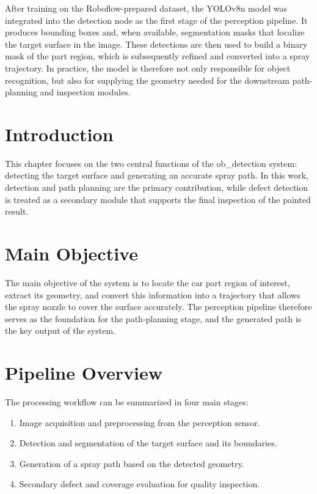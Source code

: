 After training on the Roboflow-prepared dataset, the YOLOv8n model was integrated into the detection node as the first stage of the perception pipeline. It produces bounding boxes and, when available, segmentation masks that localize the target surface in the image. These detections are then used to build a binary mask of the part region, which is subsequently refined and converted into a spray trajectory. In practice, the model is therefore not only responsible for object recognition, but also for supplying the geometry needed for the downstream path-planning and inspection modules.

\section{Introduction}
This chapter focuses on the two central functions of the ob\_detection system: detecting the target surface and generating an accurate spray path. In this work, detection and path planning are the primary contribution, while defect detection is treated as a secondary module that supports the final inspection of the painted result.

\section{Main Objective}
The main objective of the system is to locate the car part region of interest, extract its geometry, and convert this information into a trajectory that allows the spray nozzle to cover the surface accurately. The perception pipeline therefore serves as the foundation for the path-planning stage, and the generated path is the key output of the system.

\section{Pipeline Overview}
The processing workflow can be summarized in four main stages:
\begin{enumerate}
  \item Image acquisition and preprocessing from the perception sensor.
  \item Detection and segmentation of the target surface and its boundaries.
  \item Generation of a spray path based on the detected geometry.
  \item Secondary defect and coverage evaluation for quality inspection.
\end{enumerate}

